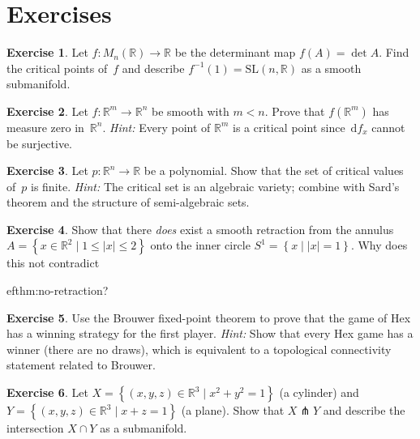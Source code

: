 \documentclass[12pt,a4paper,openany]{book}
\theoremstyle{definition}
\newtheorem{exercise}{Exercise}[chapter]
\theoremstyle{remark}
\newcommand{\R}{\mathbb{R}}
\newcommand{\SL}{\mathrm{SL}}
\newcommand{\dd}{\,\mathrm{d}}
\newcommand{\abs}[1]{\left\lvert #1 \right\rvert}
\newcommand{\set}[1]{\left\{ #1 \right\}}
\begin{document}
\section{Exercises}\label{sec:sard-exercises}

\begin{exercise}\label{exo:critical-det}
Let $f\colon M_n(\R)\to\R$ be the determinant map $f(A) = \det A$.
Find the critical points of~$f$ and describe $f^{-1}(1) = \SL(n,\R)$
as a smooth submanifold.
\end{exercise}

\begin{exercise}\label{exo:measure-zero-image}
Let $f\colon\R^m\to\R^n$ be smooth with $m < n$.  Prove that $f(\R^m)$
has measure zero in~$\R^n$.  \emph{Hint:} Every point of $\R^m$ is a
critical point since $\dd f_x$ cannot be surjective.
\end{exercise}

\begin{exercise}\label{exo:sard-polynomial}
Let $p\colon\R^n\to\R$ be a polynomial.  Show that the set of critical
values of~$p$ is finite.  \emph{Hint:} The critical set is an algebraic
variety; combine with Sard's theorem and the structure of
semi-algebraic sets.
\end{exercise}

\begin{exercise}\label{exo:retraction-annulus}
Show that there \emph{does} exist a smooth retraction from the annulus
$A = \set{x\in\R^2\mid 1\le\abs{x}\le 2}$ onto the inner circle
$S^1 = \set{x\mid\abs{x}=1}$.  Why does this not contradict

ef{thm:no-retraction}?
\end{exercise}

\begin{exercise}\label{exo:brouwer-hex}
Use the Brouwer fixed-point theorem to prove that the game of Hex
has a winning strategy for the first player.  \emph{Hint:} Show that
every Hex game has a winner (there are no draws), which is equivalent
to a topological connectivity statement related to Brouwer.
\end{exercise}

\begin{exercise}\label{exo:transverse-intersection}
Let $X = \set{(x,y,z)\in\R^3 \mid x^2+y^2 = 1}$ (a cylinder) and
$Y = \set{(x,y,z)\in\R^3\mid x+z = 1}$ (a plane).  Show that
$X\pitchfork Y$ and describe the intersection $X\cap Y$ as a
submanifold.
\end{exercise}
\end{document}
